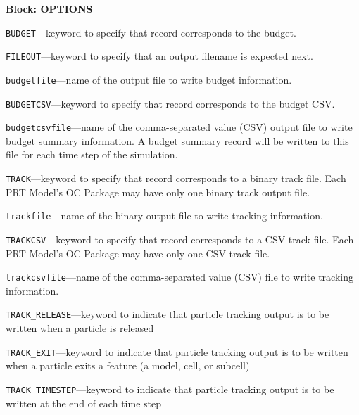 
\item \textbf{Block: OPTIONS}

\begin{description}
\item \texttt{BUDGET}---keyword to specify that record corresponds to the budget.

\item \texttt{FILEOUT}---keyword to specify that an output filename is expected next.

\item \texttt{budgetfile}---name of the output file to write budget information.

\item \texttt{BUDGETCSV}---keyword to specify that record corresponds to the budget CSV.

\item \texttt{budgetcsvfile}---name of the comma-separated value (CSV) output file to write budget summary information.  A budget summary record will be written to this file for each time step of the simulation.

\item \texttt{TRACK}---keyword to specify that record corresponds to a binary track file.  Each PRT Model's OC Package may have only one binary track output file.

\item \texttt{trackfile}---name of the binary output file to write tracking information.

\item \texttt{TRACKCSV}---keyword to specify that record corresponds to a CSV track file.  Each PRT Model's OC Package may have only one CSV track file.

\item \texttt{trackcsvfile}---name of the comma-separated value (CSV) file to write tracking information.

\item \texttt{TRACK\_RELEASE}---keyword to indicate that particle tracking output is to be written when a particle is released

\item \texttt{TRACK\_EXIT}---keyword to indicate that particle tracking output is to be written when a particle exits a feature (a model, cell, or subcell)

\item \texttt{TRACK\_TIMESTEP}---keyword to indicate that particle tracking output is to be written at the end of each time step


\end{description}
